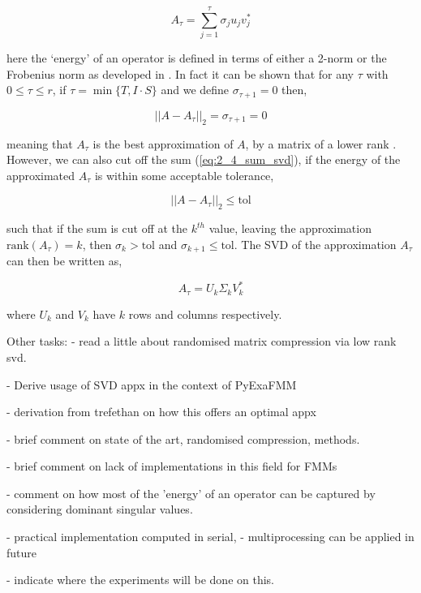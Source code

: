 \begin{equation}
    A_\tau = \sum_{j=1}^{\tau}\sigma_j u_j v_j^*
    \label{eq:2_4_sum_svd}
\end{equation}

here the `energy' of an operator is defined in terms of either a 2-norm or the
Frobenius norm as developed in \cite{Trefethen:1997:SIAM}. In fact it can be shown
that for any $\tau$ with $0 \leq \tau \leq r$, if $\tau = \min \{T, I \cdot S\}$
and we define $\sigma_{\tau + 1} = 0$ then,

\begin{equation}
    ||A - A_\tau ||_2 = \sigma_{\tau+1} = 0
\end{equation}

meaning that $A_\tau$ is the best approximation of $A$, by a matrix of a lower rank
\cite{Trefethen:1997:SIAM}. However, we can also cut off the sum (\ref{eq:2_4_sum_svd}),
if the energy of the approximated $A_\tau$ is within some acceptable tolerance,

\begin{equation}
    ||A - A_\tau ||_2  \leq  \text{tol}
\end{equation}

such that if the sum is cut off at the $k^{th}$ value, leaving the approximation
$\text{rank}(A_\tau) = k$, then $\sigma_k > \text{tol}$ and
$\sigma_{k+1} \leq \text{tol}$. The \gls{SVD} of the approximation $A_\tau$ can
then be written as,

\begin{equation}
    A_\tau = U_k \Sigma_k V_k^*
\end{equation}

where $U_k$ and $V_k$ have $k$ rows and columns respectively.




Other tasks:
- read a little about randomised matrix compression via low
rank svd.


- Derive usage of SVD appx in the context of PyExaFMM

- derivation from trefethan on how this offers an optimal appx

- brief comment on state of the art, randomised compression, methods.

- brief comment on lack of implementations in this field for FMMs

- comment on how most of the 'energy' of an operator can be captured by
considering dominant singular values.

- practical implementation computed in serial,
    - multiprocessing can be applied in future

- indicate where the experiments will be done on this.